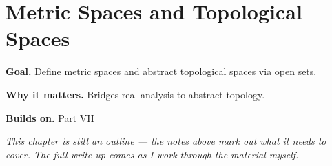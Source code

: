 \chapter{Metric Spaces and Topological Spaces}
\label{ch:09-topology-01}

\begin{chapterintro}
\textbf{Goal.} Define metric spaces and abstract topological spaces via open sets.

\textbf{Why it matters.} Bridges real analysis to abstract topology.

\textbf{Builds on.} Part VII
\end{chapterintro}

\textit{This chapter is still an outline --- the notes above mark out what it needs to cover. The full write-up comes as I work through the material myself.}
